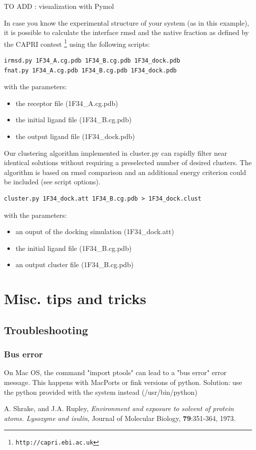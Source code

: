 \documentclass[12pt,a4paper]{article}
\begin{document}
TO ADD : visualization with Pymol




In case you know the experimental structure of your system (as in this example), it is possible to calculate the
interface rmsd and the native fraction as defined by the CAPRI contest \footnote{\tt http://capri.ebi.ac.uk}
using the following scripts:


\begin{verbatim}
irmsd.py 1F34_A.cg.pdb 1F34_B.cg.pdb 1F34_dock.pdb
fnat.py 1F34_A.cg.pdb 1F34_B.cg.pdb 1F34_dock.pdb
\end{verbatim}

with the parameters:
\begin{itemize}
\item the receptor file (1F34\_A.cg.pdb)
\item the initial ligand file (1F34\_B.cg.pdb)
\item the output ligand file (1F34\_dock.pdb)
\end{itemize}

Our clustering algorithm implemented in cluster.py can rapidly filter near identical solutions without requiring a preselected number of desired clusters.
The algorithm is based on rmsd comparison and an additional energy criterion could be included (see script options).

\begin{verbatim}
cluster.py 1F34_dock.att 1F34_B.cg.pdb > 1F34_dock.clust
\end{verbatim}

with the parameters:
\begin{itemize}
\item an ouput of the docking simulation (1F34\_dock.att)
\item the initial ligand file (1F34\_B.cg.pdb)
\item an output cluster file (1F34\_B.cg.pdb)
\end{itemize}


\section{Misc. tips and tricks}


\subsection{Troubleshooting}

\subsubsection{Bus error}
On Mac OS, the command "import ptools" can lead to a "bus error" error message. This happens with MacPorts or 
fink versions of python. Solution: use the python provided with the system instead (/usr/bin/python)



\begin{thebibliography}{99}

 A. Shrake, and J.A. Rupley, 
{\it Environment and exposure to solvent of protein atoms. Lysozyme and
isulin}, 
Journal of Molecular Biology, {\bf 79}:351-364, 1973.

\end{thebibliography}
\end{document}
